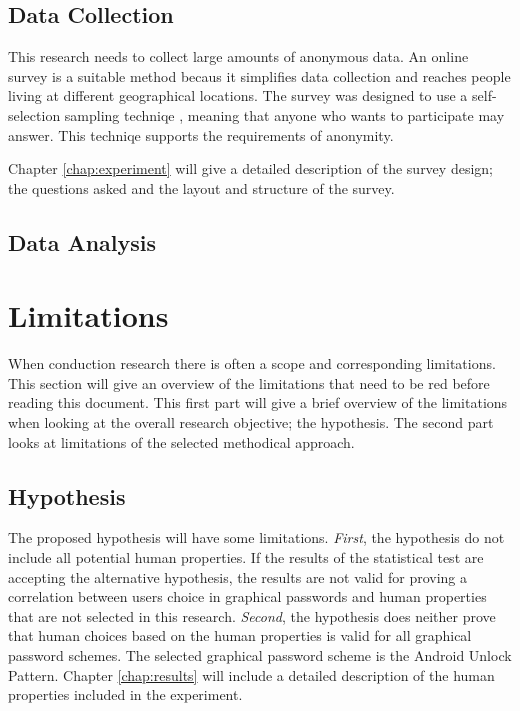 		\subsection{Data Collection}

			This research needs to collect large amounts of anonymous data. An online survey is a suitable method becaus it simplifies data collection and reaches people living at different geographical locations. The survey was designed to use a self-selection sampling techniqe \cite{empiriske}, meaning that anyone who wants to participate may answer. This techniqe supports the requirements of anonymity.

			Chapter \ref{chap:experiment} will give a detailed description of the survey design; the questions asked and the layout and structure of the survey.

		\subsection{Data Analysis}



	\section{Limitations}
		When conduction research there is often a scope and corresponding limitations. This section will give an overview of the limitations that need to be red before reading this document. This first part will give a brief overview of the limitations when looking at the overall research objective; the hypothesis. The second part looks at limitations of the selected methodical approach. 

		\subsection{Hypothesis}
	  	The proposed hypothesis will have some limitations. {\it First}, the hypothesis do not include all potential human properties. If the results of the statistical test are accepting the alternative hypothesis, the results are not valid for proving a correlation between users choice in graphical passwords and human properties that are not selected in this research. {\it Second}, the hypothesis does neither prove that human choices based on the human properties is valid for all graphical password schemes. The selected graphical password scheme is the Android Unlock Pattern. Chapter \ref{chap:results} will include a detailed description of the human properties included in the experiment.

